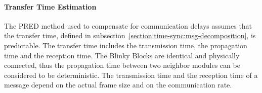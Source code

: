 


\paragraph{Transfer Time Estimation}

The PRED method used to compensate for communication delays assumes that the transfer time, defined in subsection~\ref{section:time-sync:msg-decomposition}, is predictable. The transfer time includes the transmission time, the propagation time and the reception time. The Blinky Blocks are identical and physically connected, thus the propagation time between two neighbor modules can be considered to be deterministic. The transmission time and the reception time of a message  depend on the actual frame size and on the communication rate. 

